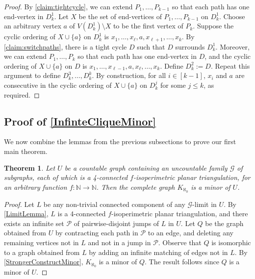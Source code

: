 \documentclass[a4paper,11pt]{article}
\theoremstyle{plain}
\newtheorem{thm}{Theorem}[section]
\theoremstyle{definition}
\renewcommand{\leq}{\leqslant}
\newcommand{\GG}{\mathcal{G}}
\newcommand{\NN}{\mathbb{N}}
\newcommand{\PART}{\mathcal{P}}
\begin{document}
\begin{proof}
By \cref{claim:tightcycle}, we can extend $P_1, \dots, P_{k-1}$ so that each path has one end-vertex in $D_k^1$. Let $X$ be the set of end-vertices of $P_1, \dots, P_{k-1}$ on $D_k^1$. Choose an arbitrary vertex $a$ of $V(D_k^1) \setminus X$ to be the first vertex of $P_k$.  Suppose the cyclic ordering of $X \cup \{a\}$ on $D_k^1$ is $x_1, \dots, x_\ell, a, x_{\ell+1}, \dots, x_k$.  By \cref{claim:switchpaths}, there is a tight cycle $D$ such that $D$ surrounds $D_k^1$. Moreover, we can extend $P_1, \dots, P_k$ so that each path has one end-vertex in $D$, and the cyclic ordering of $X \cup \{a\}$ on $D$ is $x_1, \dots, x_{\ell-1}, a, x_{\ell}, \dots, x_k$.  Define $D_k^2:=D$.  Repeat this argument to define $D_k^3, \dots, D_k^k$.  By construction, for all $i \in [k-1]$, $x_i$ and $a$ are consecutive in the cyclic ordering of $X \cup \{a\}$ on $D_k^j$ for some $j \leq k$, as required. 
\end{proof}

\subsection{Proof of \cref{InfinteCliqueMinor}}
\label{ProofInfinteCliqueMinor}

We now combine the lemmas from the previous subsections to prove our first main theorem. 

\begin{thm}
\label{InfinteCliqueMinorStrongerStronger}
Let $U$ be a countable graph containing an uncountable family $\GG$ of subgraphs, each of which is a 4-connected $f$-isoperimetric planar triangulation, for an arbitrary function $f:\NN\to\NN$. Then the complete graph $K_{\aleph_0}$ is a minor of $U$.
\end{thm}

\begin{proof}
Let $L$ be any non-trivial connected component of any $\GG$-limit in $U$. By \cref{LimitLemma}, $L$ is a 4-connected $f$-isoperimetric planar triangulation, and there exists an infinite set $\PART$ of pairwise-disjoint jumps of $L$ in $U$.  Let $Q$ be the graph obtained from $U$ by contracting each path in $\PART$ to an edge, and deleting any remaining vertices not in $L$ and not in a jump in $\PART$. Observe that $Q$ is isomorphic to a graph obtained from $L$ by adding an infinite matching of edges not in $L$. By \cref{StrongerConstructMinor}, $K_{\aleph_0}$ is a minor of $Q$. The result follows since $Q$ is a minor of $U$.
\end{proof}
\end{document}

